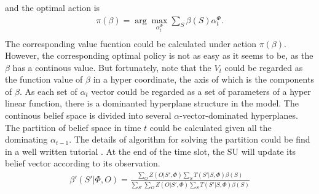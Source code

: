 \documentclass[conference]{IEEEtran}
\begin{document}
and the optimal action is
\begin{equation}
\begin{aligned}
	\pi\left(\beta\right) =
	\arg\underset{\alpha_t^\Phi}{\max}\sum\limits_{S}\beta\left(S\right)\alpha_t^\Phi.\\
\end{aligned}
\end{equation}
The corresponding value fucntion could be calculated under action \(\pi\left(\beta\right)\).
However, the corresponding optimal policy is not as easy as it seems to be, as the \(\beta\) has a continous value.
But fortunately, note that the \(V_t\) could be regarded as the function value of \(\beta\) in a hyper coordinate,
the axis of which is the components of \(\beta\).
As each set of \(\alpha_t\) vector could be regarded as a set of parameters of a hyper linear function,
there is a dominanted hyperplane structure in the model.
The continous belief space is divided into several \(\alpha\)-vector-dominated hyperplanes.
The partition of belief space in time \(t\) could be calculated given all the dominating \(\alpha_{t-1}\).
The details of algorithm for solving the partition could be find in a well written tutorial \cite{pomdptool}.
At the end of the time slot, the SU will update its belief vector according to its observation.
\begin{align}
	\beta'\left(S'|\Phi, O\right) = \frac{\sum_{O}Z\left(O|S',\Phi\right)\sum_{S}
	T\left(S'|S,\Phi\right)\beta\left(S\right)}
	{\sum_{S'}\sum_{O}Z\left(O|S',\Phi\right)\sum_{S}T\left(S'|S,\Phi\right)\beta\left(S\right)}
\end{align}
\end{document}
